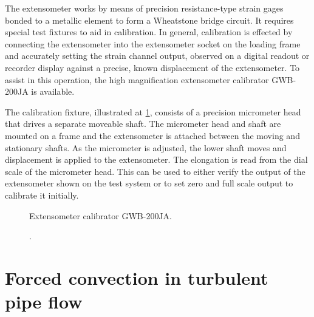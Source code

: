 The extensometer works by means of precision resistance-type strain gages bonded to a metallic element to form a Wheatstone bridge circuit.
It requires special test fixtures to aid in calibration.
In general, calibration is effected by connecting the extensometer into the extensometer socket on the loading frame and accurately setting the strain channel output, observed on a digital readout or recorder display against a precise, known displacement of the extensometer.
To assist in this operation, the high magnification extensometer calibrator GWB-200JA is available.

The calibration fixture, illustrated at \ref{Fig:Calibration}, consists of a precision micrometer head that drives a separate moveable shaft.
The micrometer head and shaft are mounted on a frame and the extensometer is attached between the moving and stationary shafts.
As the micrometer is adjusted, the lower shaft moves and displacement is applied to the extensometer.
The elongation is read from the dial scale of the micrometer head. This can be used to either verify the output of the extensometer shown on the test system or to set zero and full scale output to calibrate it initially.
\begin{figure}[!htp]
\centering{}
\caption{Extensometer calibrator GWB-200JA.}
\label{Fig:Calibration}
\end{figure}

\begin{figure}[!htp]
\centering{}
\caption{.}
\label{Fig:}
\end{figure}

\section{Forced convection in turbulent pipe flow}

